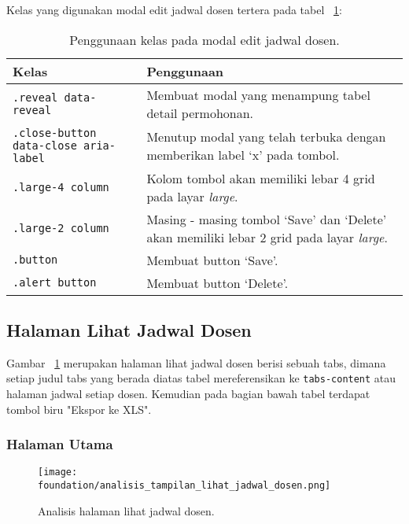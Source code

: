Kelas yang digunakan modal edit jadwal dosen tertera pada tabel ~\ref{table:analisisEditEntriJadwalDosen}:
\begin{table}[H]
	\centering
	\caption{Penggunaan kelas pada modal edit jadwal dosen.}
	\begin{tabularx}{\textwidth}{lX}
		\toprule
		Kelas     & Penggunaan \\
		\midrule
		\texttt{.reveal data-reveal} & Membuat modal yang menampung tabel detail permohonan.\\
		\texttt{.close-button data-close aria-label} & Menutup modal yang telah terbuka dengan memberikan label `x' pada tombol.\\
		\texttt{.large-4 column} & Kolom tombol akan memiliki lebar 4 grid pada layar \textit{large}.\\
		\texttt{.large-2 column} & Masing - masing tombol `Save' dan `Delete' akan memiliki lebar 2 grid pada layar \textit{large}.\\
		\texttt{.button} & Membuat button `Save'.\\
		\texttt{.alert button} & Membuat button `Delete'.\\
		\bottomrule
	\end{tabularx}%
	\label{table:analisisEditEntriJadwalDosen}
\end{table}


\subsection{Halaman Lihat Jadwal Dosen}
\noindent Gambar ~\ref{fig:analisisLihatJadwalDosen} merupakan halaman lihat jadwal dosen berisi sebuah tabs, dimana setiap judul tabs yang berada diatas tabel mereferensikan ke \texttt{tabs-content} atau halaman jadwal setiap dosen. Kemudian pada bagian bawah tabel terdapat tombol biru "Ekspor ke XLS".
\subsubsection{Halaman Utama}
\begin{figure} [H]
	\centering  
	\texttt{[image: foundation/analisis\_tampilan\_lihat\_jadwal\_dosen.png]}
	\caption{Analisis halaman lihat jadwal dosen.}
	\label{fig:analisisLihatJadwalDosen}
\end{figure}

